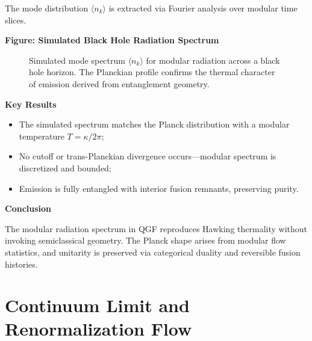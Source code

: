 \documentclass[11pt]{article}
\begin{document}
The mode distribution \( \langle n_k \rangle \) is extracted via Fourier analysis over modular time slices.

\vspace{0.5em}
\noindent\textbf{Figure: Simulated Black Hole Radiation Spectrum}

\begin{figure}[H]
\centering
{}
\caption{Simulated mode spectrum \( \langle n_k \rangle \) for modular radiation across a black hole horizon. The Planckian profile confirms the thermal character of emission derived from entanglement geometry.}
\label{fig:hawking-spectrum}
\end{figure}

\vspace{0.5em}
\noindent\textbf{Key Results}

\begin{itemize}
  \item The simulated spectrum matches the Planck distribution with a modular temperature \( T = \kappa / 2\pi \);
  \item No cutoff or trans-Planckian divergence occurs—modular spectrum is discretized and bounded;
  \item Emission is fully entangled with interior fusion remnants, preserving purity.
\end{itemize}

\vspace{0.5em}
\noindent\textbf{Conclusion}

The modular radiation spectrum in QGF reproduces Hawking thermality without invoking semiclassical geometry. The Planck shape arises from modular flow statistics, and unitarity is preserved via categorical duality and reversible fusion histories.



\section{Continuum Limit and Renormalization Flow}
\end{document}

